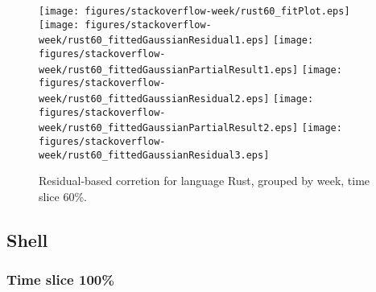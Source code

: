\begin{figure}[hb]
\centering
{}
{\texttt{[image: figures/stackoverflow-week/rust60\_fitPlot.eps]}}
{\texttt{[image: figures/stackoverflow-week/rust60\_fittedGaussianResidual1.eps]}}
{\texttt{[image: figures/stackoverflow-week/rust60\_fittedGaussianPartialResult1.eps]}}
{\texttt{[image: figures/stackoverflow-week/rust60\_fittedGaussianResidual2.eps]}}
{\texttt{[image: figures/stackoverflow-week/rust60\_fittedGaussianPartialResult2.eps]}}
{\texttt{[image: figures/stackoverflow-week/rust60\_fittedGaussianResidual3.eps]}}
\caption{Residual-based corretion for language Rust, grouped by week, time slice 60\%.}
\end{figure}


\clearpage 
\newpage 


\subsection{Shell}

\FloatBarrier

\subsubsection{Time slice 100\%}

